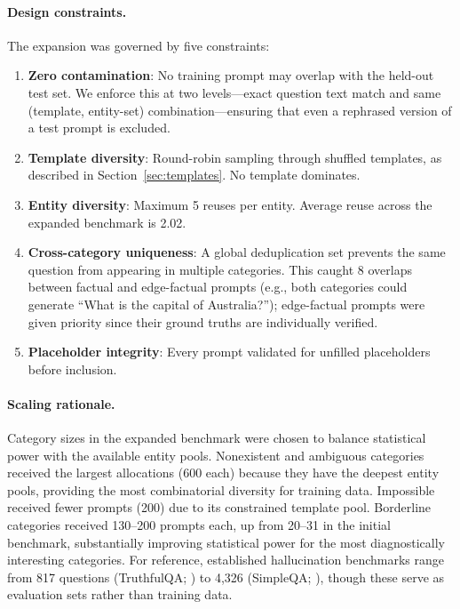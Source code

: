 \paragraph{Design constraints.} The expansion was governed by five constraints:
\begin{enumerate}
    \item \textbf{Zero contamination}: No training prompt may overlap with the held-out test set. We enforce this at two levels---exact question text match and same (template, entity-set) combination---ensuring that even a rephrased version of a test prompt is excluded.
    \item \textbf{Template diversity}: Round-robin sampling through shuffled templates, as described in Section~\ref{sec:templates}. No template dominates.
    \item \textbf{Entity diversity}: Maximum 5 reuses per entity. Average reuse across the expanded benchmark is 2.02.
    \item \textbf{Cross-category uniqueness}: A global deduplication set prevents the same question from appearing in multiple categories. This caught 8 overlaps between factual and edge-factual prompts (e.g., both categories could generate ``What is the capital of Australia?''); edge-factual prompts were given priority since their ground truths are individually verified.
    \item \textbf{Placeholder integrity}: Every prompt validated for unfilled placeholders before inclusion.
\end{enumerate}

\paragraph{Scaling rationale.} Category sizes in the expanded benchmark were chosen to balance statistical power with the available entity pools. Nonexistent and ambiguous categories received the largest allocations (600 each) because they have the deepest entity pools, providing the most combinatorial diversity for training data. Impossible received fewer prompts (200) due to its constrained template pool. Borderline categories received 130--200 prompts each, up from 20--31 in the initial benchmark, substantially improving statistical power for the most diagnostically interesting categories. For reference, established hallucination benchmarks range from 817 questions (TruthfulQA; \citealp{lin2022truthfulqa}) to 4,326 (SimpleQA; \citealp{wei2024simpleqa}), though these serve as evaluation sets rather than training data.

